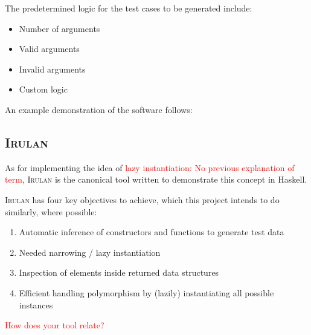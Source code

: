 \documentclass{icldt}
\numberwithin{equation}{section}       %
\begin{document}
The predetermined logic for the test cases to be generated include:
\begin{itemize}
	\item Number of arguments
	\item Valid arguments
	\item Invalid arguments
	\item Custom logic
\end{itemize}

An example demonstration of the software follows:







\subsection{\textsc{Irulan}}
As for implementing the idea of \textcolor{red}{lazy instantiation: No previous explanation of term}, \textsc{Irulan} \cite{Allwood2011} is the canonical tool written to demonstrate this concept in Haskell.

\textsc{Irulan} has four key objectives to achieve, which this project intends to do similarly, where possible:
\begin{enumerate}[1.]
	\item Automatic inference of constructors and functions to generate test data
	\item Needed narrowing / lazy instantiation
	\item Inspection of elements inside returned data structures
	\item Efficient handling polymorphism by (lazily) instantiating all possible instances
\end{enumerate}
\textcolor{red}{How does your tool relate?}
\end{document}
